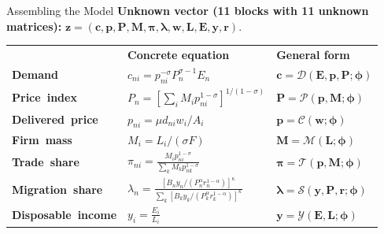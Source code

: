 \documentclass[aspectratio=169,11pt]{beamer}
\newcommand{\B}[1]{\textcolor{blue1}{\textbf{#1}}}
\begin{document}
\begin{frame}[t]{Assembling the Model}
  \scriptsize
  \B{Unknown vector (11 blocks with 11 unknown matrices):}\quad
  \(\mathbf z=(\mathbf c,\mathbf p,\mathbf P,\mathbf M,
  \boldsymbol\pi,\boldsymbol\lambda,\mathbf w,\mathbf L,\mathbf E,
  \mathbf y,\mathbf r)\).

  \vspace{-0.15em}
  {
  \renewcommand{\arraystretch}{0.78}
  \begin{tabular}{
    @{}>{\raggedright\arraybackslash}m{}
    >{\centering\arraybackslash}m{}
    >{\centering\arraybackslash}m{}@{}}
    & \B{Concrete equation} & \B{General form} \tabularnewline[0.08em]

    \mbox{\B{Demand}}
      & \(\displaystyle c_{ni}=p_{ni}^{-\sigma}P_n^{\sigma-1}E_n\)
      & \(\displaystyle \mathbf c=\mathcal D(\mathbf E,\mathbf p,\mathbf P;\boldsymbol\phi)\)
      \tabularnewline[0.12em]

    \mbox{\B{Price index}}
      & \(\displaystyle P_n=\left[\sum_iM_ip_{ni}^{1-\sigma}\right]^{1/(1-\sigma)}\)
      & \(\displaystyle \mathbf P=\mathcal P(\mathbf p,\mathbf M;\boldsymbol\phi)\)
      \tabularnewline[0.24em]

    \mbox{\B{Delivered price}}
      & \(\displaystyle p_{ni}=\mu d_{ni}w_i/A_i\)
      & \(\displaystyle \mathbf p=\mathcal C(\mathbf w;\boldsymbol\phi)\)
      \tabularnewline[0.12em]

    \mbox{\B{Firm mass}}
      & \(\displaystyle M_i=L_i/(\sigma F)\)
      & \(\displaystyle \mathbf M=\mathcal M(\mathbf L;\boldsymbol\phi)\)
      \tabularnewline[0.14em]

    \mbox{\B{Trade share}}
      & \(\displaystyle \pi_{ni}=\frac{M_ip_{ni}^{1-\sigma}}
        {\sum_kM_kp_{nk}^{1-\sigma}}\)
      & \(\displaystyle \boldsymbol\pi=\mathcal T(\mathbf p,\mathbf M;\boldsymbol\phi)\)
      \tabularnewline[0.30em]

    \mbox{\B{Migration share}}
      & \(\displaystyle
        \lambda_n=
        \frac{\left[
        B_ny_n/(P_n^\alpha r_n^{1-\alpha})\right]^\kappa}
        {\sum_k\left[
        B_ky_k/(P_k^\alpha r_k^{1-\alpha})\right]^\kappa}\)
      & \(\displaystyle \boldsymbol\lambda=\mathcal S
        (\mathbf y,\mathbf P,\mathbf r;\boldsymbol\phi)\)
      \tabularnewline[0.26em]

    \mbox{\B{Disposable income}}
      & \(\displaystyle y_i=\frac{E_i}{L_i}\)
      & \(\displaystyle \mathbf y=\mathcal Y
        (\mathbf E,\mathbf L;\boldsymbol\phi)\)
      \tabularnewline[0.12em]


\end{tabular}}
\end{frame}
\end{document}
